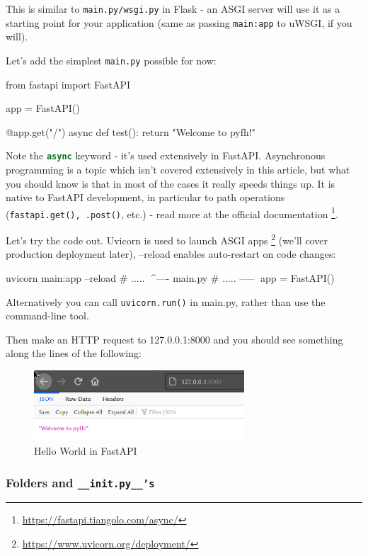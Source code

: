\documentclass[14pt]{extarticle}
\newcommand{\flink}[1]{\footnote{\href{#1}{#1}}}
\newcommand{\pyinline}[1]{\lstinline[language=Python, style=cstyle, morekeywords={async}, basicstyle=\ttfamily\normalsize]{#1}}
\begin{document}
This is similar to \texttt{main.py/wsgi.py} in Flask - an ASGI server will use it as a starting point for your application (same as passing \texttt{main:app} to uWSGI, if you will).

Let's add the simplest \texttt{main.py} possible for now:

\begin{pycode}
    from fastapi import FastAPI

    app = FastAPI()

    @app.get("/")
    async def test():
        return "Welcome to pyfh!"
\end{pycode}

Note the \pyinline{async} keyword - it's used extensively in FastAPI. Asynchronous programming is a topic which isn't covered extensively in this article, but what you should know is that in most of the cases it really speeds things up. It is native to FastAPI development, in particular to path operations (\pyinline{fastapi.get(), .post()}, etc.) - read more at the official documentation \flink{https://fastapi.tiangolo.com/async/}.

Let's try the code out. Uvicorn is used to launch ASGI apps \flink{https://www.uvicorn.org/deployment/} (we'll cover production deployment later), --reload enables auto-restart on code changes:

\begin{bashcode}
    uvicorn main:app --reload
    # ..... ^^^^---- main.py
    # ..... -----^^^ app = FastAPI()
\end{bashcode}

Alternatively you can call \texttt{uvicorn.run()} in main.py, rather than use the command-line tool.

Then make an HTTP request to 127.0.0.1:8000 and you should see something along the lines of the following:

\begin{figure}[h]
    \centering
    \includegraphics[width=0.7\textwidth]{img/helloworld.png}
    \caption{Hello World in FastAPI}
\end{figure}

\subsubsection{Folders and \texttt{\_\_init.py\_\_'s}}
\end{document}
